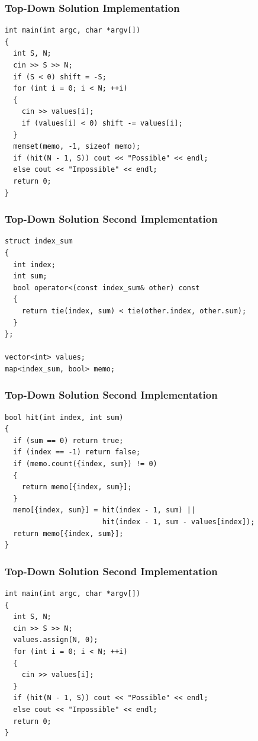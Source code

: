 \documentclass{beamer}
\begin{document}
\begin{frame}[containsverbatim]
\frametitle{Top-Down Solution Implementation}

\scriptsize
\begin{lstlisting}
int main(int argc, char *argv[])
{
  int S, N;
  cin >> S >> N;
  if (S < 0) shift = -S;
  for (int i = 0; i < N; ++i)
  {
    cin >> values[i];
    if (values[i] < 0) shift -= values[i];
  }
  memset(memo, -1, sizeof memo);
  if (hit(N - 1, S)) cout << "Possible" << endl;
  else cout << "Impossible" << endl;
  return 0;
}
\end{lstlisting}

\end{frame}

\begin{frame}[containsverbatim]
\frametitle{Top-Down Solution Second Implementation}
\scriptsize

\begin{lstlisting}
struct index_sum
{
  int index;
  int sum;
  bool operator<(const index_sum& other) const
  {
    return tie(index, sum) < tie(other.index, other.sum);
  }
};

vector<int> values;
map<index_sum, bool> memo;
\end{lstlisting}

\end{frame}

\begin{frame}[containsverbatim]
\frametitle{Top-Down Solution Second Implementation}
\scriptsize

\begin{lstlisting}
bool hit(int index, int sum)
{
  if (sum == 0) return true;
  if (index == -1) return false;
  if (memo.count({index, sum}) != 0)
  {
    return memo[{index, sum}];
  }
  memo[{index, sum}] = hit(index - 1, sum) ||
                       hit(index - 1, sum - values[index]);
  return memo[{index, sum}];
}
\end{lstlisting}

\end{frame}

\begin{frame}[containsverbatim]
\frametitle{Top-Down Solution Second Implementation}
\scriptsize

\begin{lstlisting}
int main(int argc, char *argv[])
{
  int S, N;
  cin >> S >> N;
  values.assign(N, 0);
  for (int i = 0; i < N; ++i)
  {
    cin >> values[i];
  }
  if (hit(N - 1, S)) cout << "Possible" << endl;
  else cout << "Impossible" << endl;
  return 0;
}
\end{lstlisting}

\end{frame}
\end{document}
